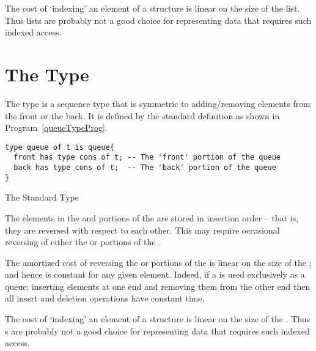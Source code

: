\begin{aside}
The cost of `indexing' an element of a  structure is linear on the size of the  list. Thus  lists are probably not a good choice for representing data that requires such indexed access.
\end{aside}

\section{The  Type}
\label{queueType}
The  type is a sequence type that is symmetric to adding/removing elements from the front or the back. It is defined by the standard definition as shown in Program~\vref{queueTypeProg}.

\begin{program}
\begin{lstlisting}
type queue of t is queue{
  front has type cons of t; -- The 'front' portion of the queue
  back has type cons of t;  -- The 'back' portion of the queue
}
\end{lstlisting}
\caption{The Standard  Type}\label{queueTypeProg}
\end{program}
\begin{aside}
The elements in the  and  portions of the  are stored in insertion order -- that is, they are reversed with respect to each other. This may require occasional reversing of either the  or  portions of the .
\end{aside}

\begin{aside}
The amortized cost of reversing the   or  portions of the  is linear on the size of the ; and hence is constant for any given element. Indeed, if a  is used exclusively as a queue: inserting elements at one end and removing them from the other end then all insert and deletion operations have constant time.
\end{aside}

\begin{aside}
The cost of `indexing' an element of a  structure is linear on the size of the . Thus s are probably not a good choice for representing data that requires such indexed access.
\end{aside}
